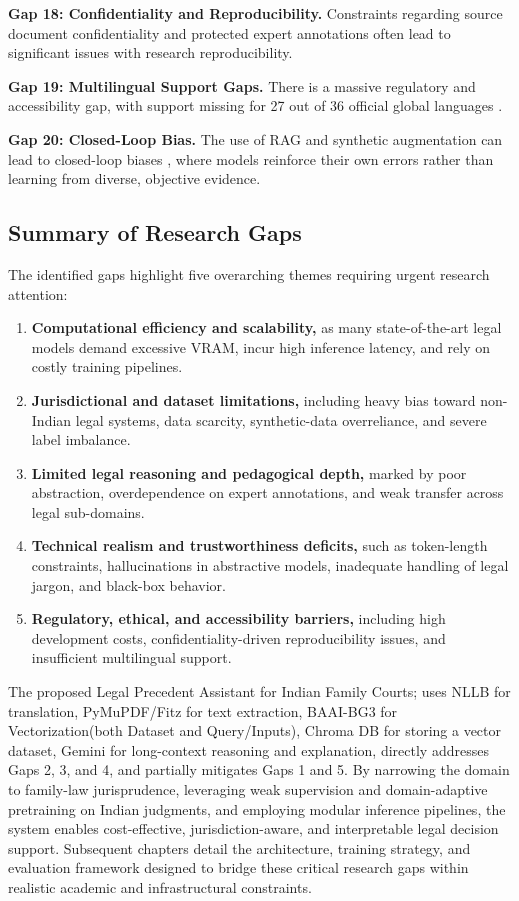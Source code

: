 \textbf{Gap 18: Confidentiality and Reproducibility.} Constraints regarding source document confidentiality and protected expert annotations \cite{b19} \cite{b24} \cite{b25} often lead to significant issues with research reproducibility.

\textbf{Gap 19: Multilingual Support Gaps.} There is a massive regulatory and accessibility gap, with support missing for 27 out of 36 official global languages \cite{b1}.

\textbf{Gap 20: Closed-Loop Bias.} The use of RAG and synthetic augmentation can lead to closed-loop biases \cite{b20}, where models reinforce their own errors rather than learning from diverse, objective evidence.

\subsection{Summary of Research Gaps}
The identified gaps highlight five overarching themes requiring urgent research attention:
\begin{enumerate}
    \item \textbf{Computational efficiency and scalability,} as many state-of-the-art legal models demand excessive VRAM, incur high inference latency, and rely on costly training pipelines.
    \item \textbf{Jurisdictional and dataset limitations,} including heavy bias toward non-Indian legal systems, data scarcity, synthetic-data overreliance, and severe label imbalance.
    \item \textbf{Limited legal reasoning and pedagogical depth,} marked by poor abstraction, overdependence on expert annotations, and weak transfer across legal sub-domains.
    \item \textbf{Technical realism and trustworthiness deficits,}  such as token-length constraints, hallucinations in abstractive models, inadequate handling of legal jargon, and black-box behavior.
    \item \textbf{Regulatory, ethical, and accessibility barriers,} including high development costs, confidentiality-driven reproducibility issues, and insufficient multilingual support.
\end{enumerate}

\noindent The proposed Legal Precedent Assistant for Indian Family Courts; uses NLLB for translation, PyMuPDF/Fitz for text extraction, BAAI-BG3 for Vectorization(both Dataset and Query/Inputs), Chroma DB for storing a vector dataset, Gemini for long-context reasoning and explanation, directly addresses Gaps 2, 3, and 4, and partially mitigates Gaps 1 and 5. By narrowing the domain to family-law jurisprudence, leveraging weak supervision and domain-adaptive pretraining on Indian judgments, and employing modular inference pipelines, the system enables cost-effective, jurisdiction-aware, and interpretable legal decision support. Subsequent chapters detail the architecture, training strategy, and evaluation framework designed to bridge these critical research gaps within realistic academic and infrastructural constraints.